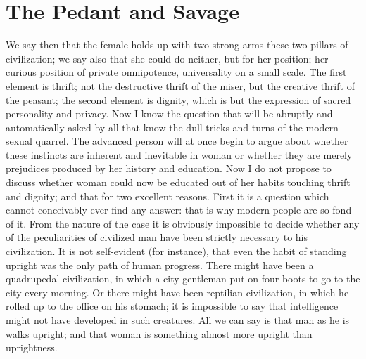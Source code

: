 \documentclass{book}
\begin{document}
\chapter{The Pedant and Savage}
\label{chapter-24}
We say then that the female holds up with two strong arms these two pillars of civilization; we say also that she could do neither, but for her position; her curious position of private omnipotence, universality on a small scale. The first element is thrift; not the destructive thrift of the miser, but the creative thrift of the peasant; the second element is dignity, which is but the expression of sacred personality and privacy. Now I know the question that will be abruptly and automatically asked by all that know the dull tricks and turns of the modern sexual quarrel. The advanced person will at once begin to argue about whether these instincts are inherent and inevitable in woman or whether they are merely prejudices produced by her history and education. Now I do not propose to discuss whether woman could now be educated out of her habits touching thrift and dignity; and that for two excellent reasons. First it is a question which cannot conceivably ever find any answer: that is why modern people are so fond of it. From the nature of the case it is obviously impossible to decide whether any of the peculiarities of civilized man have been strictly necessary to his civilization. It is not self-evident (for instance), that even the habit of standing upright was the only path of human progress. There might have been a quadrupedal civilization, in which a city gentleman put on four boots to go to the city every morning. Or there might have been reptilian civilization, in which he rolled up to the office on his stomach; it is impossible to say that intelligence might not have developed in such creatures. All we can say is that man as he is walks upright; and that woman is something almost more upright than uprightness.
\end{document}
